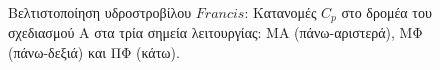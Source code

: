 \begin{figure}[h!]
\begin{minipage}[b]{0.5\linewidth}
\end{minipage}
\begin{minipage}[b]{1\linewidth}
 \centering
\end{minipage}
\caption{Βελτιστοποίηση υδροστροβίλου $Francis$: Κατανομές $C_p$ στο δρομέα του σχεδιασμού Α στα τρία σημεία λειτουργίας: ΜΑ (πάνω-αριστερά), ΜΦ (πάνω-δεξιά) και ΠΦ (κάτω).}
\label{Francis-A}
\end{figure}


